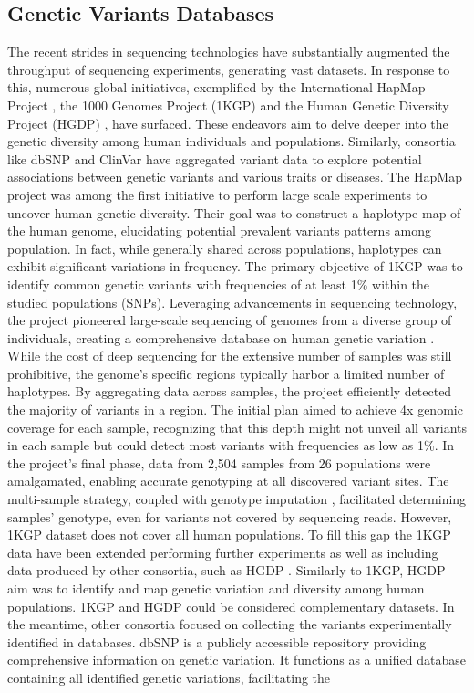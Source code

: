 \documentclass[a4paper, titlepage, openright]{book}
\begin{document}
\subsection{Genetic Variants Databases}
The recent strides in sequencing technologies have substantially augmented the throughput of sequencing experiments, generating vast datasets. In response to this, numerous global initiatives, exemplified by the International HapMap Project \citep{gibbs2003international, international2005haplotype}, the 1000 Genomes Project (1KGP) \citep{siva20081000, 10002015global} and the Human Genetic Diversity Project (HGDP) \citep{cavalli2005human}, have surfaced. These endeavors aim to delve deeper into the genetic diversity among human individuals and populations. Similarly, consortia like dbSNP \citep{sherry2001dbsnp} and ClinVar \citep{landrum2020clinvar} have aggregated variant data to explore potential associations between genetic variants and various traits or diseases. The HapMap project was among the first initiative to perform large scale experiments to uncover human genetic diversity. Their goal was to construct a haplotype map of the human genome, elucidating potential prevalent variants patterns among population. In fact, while generally shared across populations, haplotypes can exhibit significant variations in frequency. The primary objective of 1KGP was to identify common genetic variants with frequencies of at least 1\% within the studied populations (SNPs). Leveraging advancements in sequencing technology, the project pioneered large-scale sequencing of genomes from a diverse group of individuals, creating a comprehensive database on human genetic variation \citep{fairley2020international}. While the cost of deep sequencing for the extensive number of samples was still prohibitive, the genome's specific regions typically harbor a limited number of haplotypes. By aggregating data across samples, the project efficiently detected the majority of variants in a region. The initial plan aimed to achieve 4x genomic coverage for each sample, recognizing that this depth might not unveil all variants in each sample but could detect most variants with frequencies as low as 1\%. In the project's final phase, data from 2,504 samples from 26 populations were amalgamated, enabling accurate genotyping at all discovered variant sites. The multi-sample strategy, coupled with genotype imputation \citep{li2009genotype}, facilitated determining samples' genotype, even for variants not covered by sequencing reads. However, 1KGP dataset does not cover all human populations. To fill this gap the 1KGP data have been extended performing further experiments as well as including data produced by other consortia, such as HGDP \citep{bergstrom2020insights}. Similarly to 1KGP, HGDP aim was to identify and map genetic variation and diversity among human populations. 1KGP and HGDP could be considered complementary datasets. In the meantime, other consortia focused on collecting the variants experimentally identified in databases. dbSNP \citep{sherry2001dbsnp} is a publicly accessible repository providing comprehensive information on genetic variation. It functions as a unified database containing all identified genetic variations, facilitating the 
\end{document}
